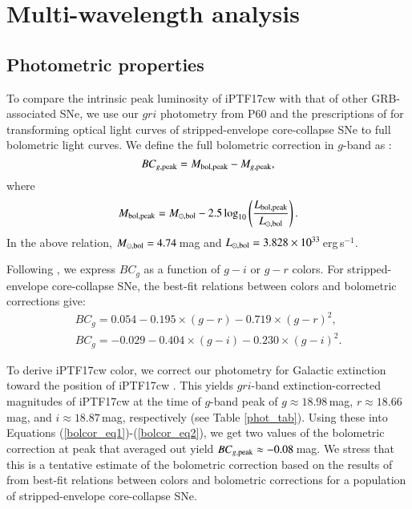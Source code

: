 \documentclass[twocolumn]{emulateapj}
\begin{document}
\section{Multi-wavelength analysis}
\label{Analysis}
\subsection{Photometric properties}
\label{opticalproperties}
To compare the intrinsic peak luminosity of iPTF17cw with that of other GRB-associated SNe, we use our $gri$ photometry from P60 and the prescriptions of \citet{Lyman2014} for transforming optical light curves of stripped-envelope core-collapse SNe to full bolometric light curves. We define the full bolometric correction in $g$-band as \citep{Lyman2014}:
\begin{equation}
BC_{g,\rm peak}=M_{\rm bol,peak}-M_{g,\rm peak},
\label{mbol_eq}
\end{equation}
where 
\begin{equation}
M_{\rm bol,peak}=M_{\odot,\rm bol}-2.5\log_{10}\left(\frac{L_{\rm bol,peak}}{L_{\odot,\rm bol}}\right).
\end{equation}
In the above relation, $M_{\odot,\rm bol}=4.74$\,mag and $L_{\odot,\rm bol}=3.828\times10^{33}$\,erg\,s$^{-1}$. 

Following \citet{Lyman2014}, we express $BC_g$ as a function of $g-i$ or $g-r$ colors. For stripped-envelope core-collapse SNe, the best-fit relations between colors and bolometric corrections give:
\begin{eqnarray}
 BC_{g}=0.054-0.195\times(g-r)-0.719\times(g-r)^2 \label{bolcor_eq1},\\
BC_{g}=-0.029-0.404\times(g-i)-0.230\times(g-i)^2 \label{bolcor_eq2}.
\end{eqnarray}

To derive iPTF17cw color, we correct our photometry for Galactic extinction toward the position of iPTF17cw \citep[$A_V=0.0517$\,mag which, assuming an extinction to reddening ratio $A_{V} / E(B-V) = 3.1$, implies $A_g=0.064$\,mag, $A_r=0.044$\,mag, $A_i=0.033$\,mag; ][]{Schlafly2011}. This yields $gri$-band extinction-corrected magnitudes of iPTF17cw at the time of $g$-band peak of $g\approx 18.98$\,mag, $r\approx 18.66$\,mag, and $i\approx 18.87$\,mag, respectively (see Table \ref{phot_tab}).  Using these into Equations (\ref{bolcor_eq1})-(\ref{bolcor_eq2}), we get two values of the bolometric correction at peak that averaged out yield $BC_{g,\rm peak}\approx -0.08$\,mag. We stress that this is a tentative estimate of the bolometric correction based on the results of \citet{Lyman2014} from best-fit relations between colors and bolometric corrections for a population of stripped-envelope core-collapse SNe. 
\end{document}
